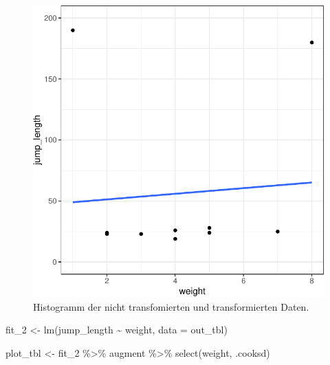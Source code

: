 \documentclass[
  letterpaper,
]{scrbook}
\newenvironment{Shaded}{\begin{snugshade}}{\end{snugshade}}
\newcommand{\AttributeTok}[1]{\textcolor[rgb]{0.40,0.45,0.13}{#1}}
\newcommand{\FunctionTok}[1]{\textcolor[rgb]{0.28,0.35,0.67}{#1}}
\newcommand{\NormalTok}[1]{\textcolor[rgb]{0.00,0.23,0.31}{#1}}
\newcommand{\OtherTok}[1]{\textcolor[rgb]{0.00,0.23,0.31}{#1}}
\newcommand{\SpecialCharTok}[1]{\textcolor[rgb]{0.37,0.37,0.37}{#1}}
\begin{document}
\begin{figure}
\begin{minipage}[t]{0.50\linewidth}
{{\includegraphics{./stat-modeling-outlier_files/figure-pdf/fig-cooks-1-2.pdf}

}

}

\end{minipage}%

\caption{\label{fig-cooks-1}Histogramm der nicht transfomierten und
transformierten Daten.}

\end{figure}

\begin{Shaded}
\begin{Highlighting}[]
\NormalTok{fit\_2 }\OtherTok{\textless{}{-}} \FunctionTok{lm}\NormalTok{(jump\_length }\SpecialCharTok{\textasciitilde{}}\NormalTok{ weight, }\AttributeTok{data =}\NormalTok{ out\_tbl)}
\end{Highlighting}
\end{Shaded}

\begin{Shaded}
\begin{Highlighting}[]
\NormalTok{plot\_tbl }\OtherTok{\textless{}{-}}\NormalTok{ fit\_2 }\SpecialCharTok{\%\textgreater{}\%} 
\NormalTok{  augment }\SpecialCharTok{\%\textgreater{}\%} 
  \FunctionTok{select}\NormalTok{(weight, .cooksd)}
\end{Highlighting}
\end{Shaded}
\end{document}
